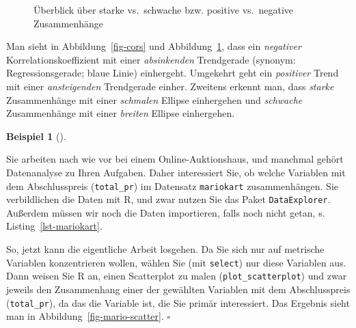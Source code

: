 \documentclass[
  letterpaper,
  twoside,
  open=any]{scrbook}
\theoremstyle{definition}
\theoremstyle{definition}
\newtheorem{example}{Beispiel}[chapter]
\theoremstyle{definition}
\theoremstyle{remark}
\begin{document}
\begin{figure}


\caption{\label{fig-cors2}Überblick über starke vs.~schwache bzw.
positive vs.~negative Zusammenhänge}

\end{figure}%

Man sieht in Abbildung~\ref{fig-cors} und Abbildung~\ref{fig-cors2},
dass ein \emph{negativer} Korrelationskoeffizient mit einer
\emph{absinkenden} Trendgerade (synonym: Regressionsgerade; blaue Linie)
einhergeht. Umgekehrt geht ein \emph{positiver} Trend mit einer
\emph{ansteigenden} Trendgerade einher. Zweitens erkennt man, dass
\emph{starke} Zusammenhänge mit einer \emph{schmalen} Ellipse
einhergehen und \emph{schwache} Zusammenhänge mit einer \emph{breiten}
Ellipse einhergehen.

\begin{example}[]\protect\hypertarget{exm-scatter}{}\label{exm-scatter}

Sie arbeiten nach wie vor bei einem Online-Auktionshaus, und manchmal
gehört Datenanalyse zu Ihren Aufgaben. Daher interessiert Sie, ob welche
Variablen mit dem Abschlusspreis (\texttt{total\_pr}) im Datensatz
\texttt{mariokart} zusammenhängen. Sie verbildlichen die Daten mit R,
und zwar nutzen Sie das Paket \texttt{DataExplorer}. Außerdem müssen wir
noch die Daten importieren, falls noch nicht getan, s.
Listing~\ref{lst-mariokart}.

So, jetzt kann die eigentliche Arbeit losgehen. Da Sie sich nur auf
metrische Variablen konzentrieren wollen, wählen Sie (mit
\texttt{select}) nur diese Variablen aus. Dann weisen Sie R an, einen
Scatterplot zu malen (\texttt{plot\_scatterplot}) und zwar jeweils den
Zusammenhang einer der gewählten Variablen mit dem Abschlusspreis
(\texttt{total\_pr}), da das die Variable ist, die Sie primär
interessiert. Das Ergebnis sieht man in
Abbildung~\ref{fig-mario-scatter}. \(\square\)

\end{example}
\end{document}
